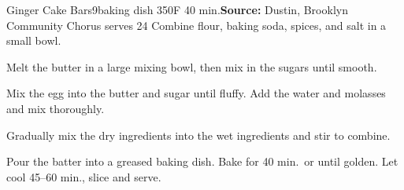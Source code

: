 \begin{recipe}{Ginger Cake Bars}{9\inch{}\inch baking dish \hfill 350\0F \hfill 40 min.}{\textbf{Source:} Dustin, Brooklyn Community Chorus \hfill serves 24}
 Combine flour, baking soda, spices, and salt in a small bowl.

 Melt the butter in a large mixing bowl, then mix in the sugars until smooth.

 Mix the egg into the butter and sugar until fluffy. Add the water and molasses and mix thoroughly.

 \newstep Gradually mix the dry ingredients into the wet ingredients and stir to combine.

 \newstep Pour the batter into a greased baking dish. Bake for 40 min.\ or until golden. Let cool 45--60 min., slice and serve.
\end{recipe}

